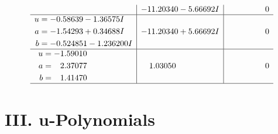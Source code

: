 \documentclass[1p]{elsarticle_modified}
\theoremstyle{definition}
\begin{document}
$$\begin{array}{c|c|c}
 & -11.20340 - 5.66692 I & \phantom{-0.000000 } 0 \\ \hline\begin{aligned}
u &= -0.58639 - 1.36575 I \\
a &= -1.54293 + 0.34688 I \\
b &= -0.524851 - 1.236200 I\end{aligned}
 & -11.20340 + 5.66692 I & \phantom{-0.000000 } 0 \\ \hline\begin{aligned}
u &= -1.59010\phantom{ +0.000000I} \\
a &= \phantom{-}2.37077\phantom{ +0.000000I} \\
b &= \phantom{-}1.41470\phantom{ +0.000000I}\end{aligned}
 & \phantom{-}1.03050\phantom{ +0.000000I} & \phantom{-0.000000 } 0\\
 \hline 
 \end{array}$$\newpage
\newpage\renewcommand{\arraystretch}{1}
\centering \section*{ III. u-Polynomials}
\end{document}
